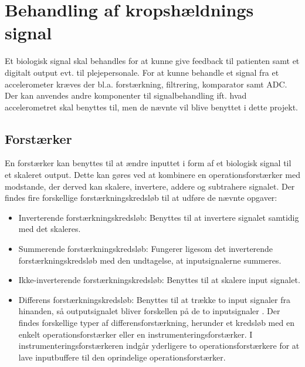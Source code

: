 \section{Behandling af kropshældnings signal}
Et biologisk signal skal behandles for at kunne give feedback til patienten samt et digitalt output evt. til plejepersonale. For at kunne behandle et signal fra et accelerometer kræves der bl.a. forstærkning, filtrering, komparator samt ADC. Der kan anvendes andre komponenter til signalbehandling ift. hvad accelerometret skal benyttes til, men de nævnte vil blive benyttet i dette projekt. 

\subsection{Forstærker}\label{forstaerkerafsnit}
En forstærker kan benyttes til at ændre inputtet i form af et biologisk signal til et skaleret output. Dette kan gøres ved at kombinere en operationsforstærker med modstande, der derved kan skalere, invertere, addere og subtrahere signalet. Der findes fire forskellige forstærkningskredsløb til at udføre de nævnte opgaver: \cite{Nilsson2011}
\begin{itemize}
\item Inverterende forstærkningskredsløb: Benyttes til at invertere signalet samtidig med det skaleres.%
\item Summerende forstærkningskredsløb: Fungerer ligesom det inverterende forstærkningskredsløb med den undtagelse, at inputsignalerne summeres.
\item Ikke-inverterende forstærkningskredsløb: Benyttes til at skalere input signalet.
\item Differens forstærkningskredsløb: Benyttes til at trække to input signaler fra hinanden, så outputsignalet bliver forskellen på de to inputsignaler \cite{Nilsson2011}. Der findes forskellige typer af differensforstærkning, herunder et kredsløb med en enkelt operationsforstærker eller en instrumenteringsforstærker. I instrumenteringsforstærkeren indgår yderligere to operationsforstærkere for at lave inputbuffere til den oprindelige operationsforstærker. \cite{Sedra2010}  
\end{itemize} 

